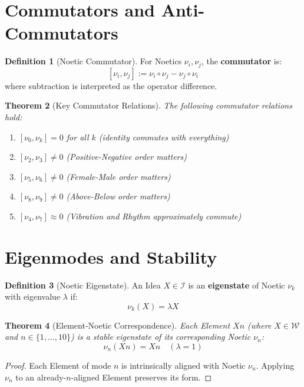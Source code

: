 \documentclass[11pt,twoside,openright]{book}
\theoremstyle{definition}
\newtheorem{definition}{Definition}[chapter]
\theoremstyle{plain}
\newtheorem{theorem}[definition]{Theorem}
\theoremstyle{remark}
\newcommand{\Worlds}{\mathcal{W}}
\newcommand{\Ideas}{\mathcal{I}}
\newcommand{\noe}[1]{\nu_{#1}}
\begin{document}
\section{Commutators and Anti-Commutators}

\begin{definition}[Noetic Commutator]
\label{def:commutator}
For Noetics $\noe{i}, \noe{j}$, the \textbf{commutator} is:
\[
[\noe{i}, \noe{j}] := \noe{i} \circ \noe{j} - \noe{j} \circ \noe{i}
\]
where subtraction is interpreted as the operator difference.
\end{definition}

\begin{theorem}[Key Commutator Relations]
\label{thm:commutators}
The following commutator relations hold:
\begin{enumerate}
  \item $[\noe{0}, \noe{k}] = 0$ for all $k$ (identity commutes with everything)
  \item $[\noe{2}, \noe{3}] \neq 0$ (Positive-Negative order matters)
  \item $[\noe{5}, \noe{6}] \neq 0$ (Female-Male order matters)
  \item $[\noe{8}, \noe{9}] \neq 0$ (Above-Below order matters)
  \item $[\noe{4}, \noe{7}] \approx 0$ (Vibration and Rhythm approximately commute)
\end{enumerate}
\end{theorem}

\section{Eigenmodes and Stability}

\begin{definition}[Noetic Eigenstate]
\label{def:eigenstate}
An Idea $X \in \Ideas$ is an \textbf{eigenstate} of Noetic $\noe{k}$ with eigenvalue $\lambda$ if:
\[
\noe{k}(X) = \lambda X
\]
\end{definition}

\begin{theorem}[Element-Noetic Correspondence]
\label{thm:element-noetic}
Each Element $Xn$ (where $X \in \Worlds$ and $n \in \{1,\ldots,10\}$) is a stable eigenstate of its corresponding Noetic $\noe{n}$:
\[
\noe{n}(Xn) = Xn \quad (\lambda = 1)
\]
\end{theorem}

\begin{proof}
Each Element of mode $n$ is intrinsically aligned with Noetic $\noe{n}$. Applying $\noe{n}$ to an already-$n$-aligned Element preserves its form.
\end{proof}
\end{document}
